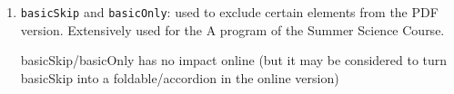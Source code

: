 \documentclass{ximera}
\begin{document}
\begin{enumerate}

    \item \verb|basicSkip| and \verb|basicOnly|: used to exclude certain elements from the PDF version. Extensively used for the A program of the Summer Science Course.

    basicSkip/basicOnly has no impact online (but it may be considered to turn basicSkip into a foldable/accordion in the online version)


\end{enumerate}
\end{document}
